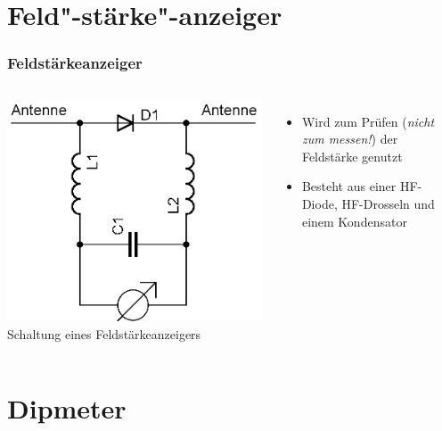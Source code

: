 \section*{Feld"-stärke"-anzeiger}
\begin{frame}
  \frametitle{Feldstärkeanzeiger}
  \begin{columns}
    \begin{center}
      \includegraphics[width=\textwidth,height=.8\textheight,keepaspectratio]{a16/Feldstaerkeanzeiger.png}\\
      {\tiny Schaltung eines Feldstärkeanzeigers}
    \end{center}
    \begin{itemize}
      \item Wird zum Prüfen (\emph{nicht zum messen!}) der Feldstärke genutzt
      \item Besteht aus einer HF-Diode, HF-Drosseln und einem Kondensator
    \end{itemize}
  \end{columns}
\end{frame}

\section*{Dipmeter}

